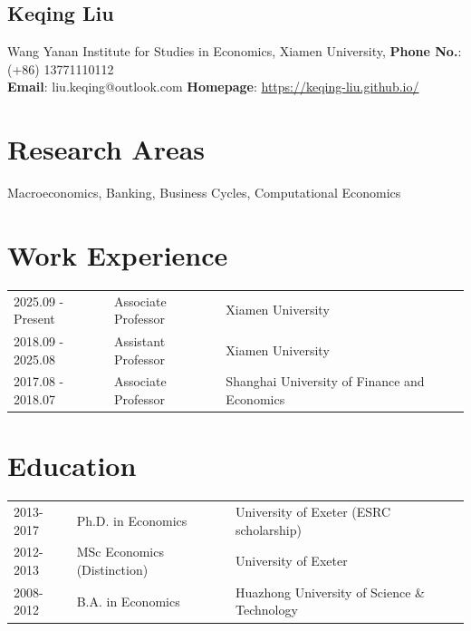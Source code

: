 \documentclass[11pt]{article}
\begin{document}
\begin{center}

\section*{Keqing Liu}

\end{center}




\begin{center}
Wang Yanan Institute for Studies in Economics,  Xiamen University, \quad \textbf{Phone No.}: (+86) 13771110112  \\ 
\textbf{Email}: liu.keqing@outlook.com \quad \textbf{Homepage}: \url{https://keqing-liu.github.io/} \\
\vspace{0.1in}
\end{center}

\section*{Research Areas}
Macroeconomics, Banking, Business Cycles, Computational Economics


\section*{Work Experience}

\begin{tabular}{L{3.2cm} L{3.5cm} L{9cm}}
2025.09 - Present & Associate Professor & Xiamen University \\
2018.09 - 2025.08 & Assistant Professor & Xiamen University \\
2017.08 - 2018.07 & Associate Professor & Shanghai University of Finance and Economics \\
\end{tabular}

\section*{Education}

\begin{tabular}{L{2.4cm} L{5cm} L{8cm}}
2013-2017 &  Ph.D. in Economics & University of Exeter (ESRC scholarship)\\
2012-2013 & MSc Economics (Distinction) & University of Exeter\\
2008-2012 & B.A. in Economics &  Huazhong University of Science \& Technology 
\end{tabular}
\end{document}
